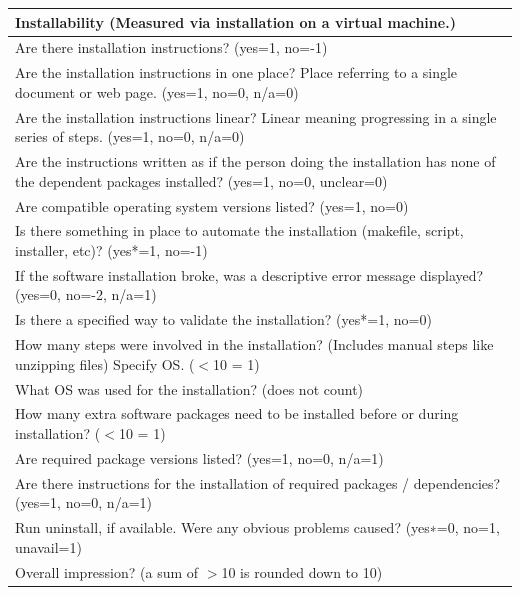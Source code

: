 \documentclass[12pt, notitlepage]{article}
\begin{document}
\begin{singlespace}
\label{gradingtemplate}
\def\arraystretch{1.5}
\begin{tabular}{p{16cm}}
	\hline		
	\textbf{Installability  (Measured via installation on a virtual machine.) }\\
	\hline
	Are there installation instructions? ({yes=1, no=-1})\\
	Are the installation instructions in one place? Place referring to a single document or web page. ({yes=1, no=0, n/a=0})\\
	Are the installation instructions linear? Linear meaning progressing  in a single series of steps. ({yes=1, no=0, n/a=0})\\
	Are the instructions written as if the person doing the installation has none of the dependent packages installed? ({yes=1, no=0, unclear=0})\\
	Are compatible operating system versions listed? ({yes=1, no=0})\\
	Is there something in place to automate the installation (makefile, script, installer, etc)? ({yes*=1, no=-1})\\
	If the software installation broke, was a descriptive error message displayed? ({yes=0, no=-2, n/a=1})\\
	Is there a specified way to validate the installation? ({yes*=1, no=0})\\
	How many steps were involved in the installation? (Includes manual steps like unzipping files) Specify OS. ($<$10 = 1)\\
	What OS was used for the installation? (does not count)\\
	How many extra software packages need to be installed before or during installation? ($<$10 = 1)\\
	Are required package versions listed? ({yes=1, no=0, n/a=1})\\
	Are there instructions for the installation of required packages / dependencies? ({yes=1, no=0, n/a=1})\\
	Run uninstall, if available. Were any obvious problems caused? ({yes∗=0, no=1, unavail=1})\\
	Overall impression? (a sum of $>$10 is rounded down to 10)\\
	\hline
\end{tabular}


\end{singlespace}
\end{document}
